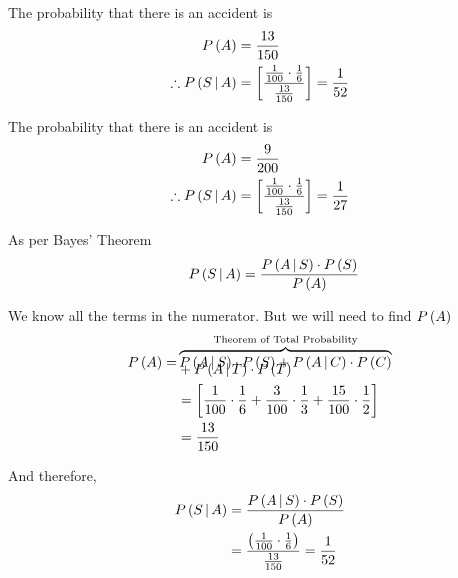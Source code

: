 \documentclass[14pt,fleqn]{extarticle}
\begin{document}
\begin{question}
\begin{step}
\end{step}

\begin{step}
  \begin{options} 
     \correct 
     
       The probability that there is an accident is 
       \begin{align}
       P\left( A\right) &= \frac{13}{150} \\
       \therefore P\left(S\,\vert\,A\right) &= \left[ \dfrac{\frac{1}{100}\cdot\frac{1}{6}}{\frac{13}{150}}\right] =\frac{1}{52} 
\end{align}
     \incorrect
     
     The probability that there is an accident is 
       \begin{align}
       P\left( A\right) &= \frac{9}{200} \\
       \therefore P\left(S\,\vert\,A\right) &= \left[ \dfrac{\frac{1}{100}\cdot\frac{1}{6}}{\frac{13}{150}}\right] =\frac{1}{27} 
\end{align}
        
    \end{options} 
     \reason 
       
     As per Bayes' Theorem 
     \[ \qquad P\left(S\,\vert\,A\right) = \frac{P\left(A\,\vert\,S\right)\cdot P\left(S\right)}{P\left(A\right)}  \]
     
     We know all the terms in the numerator. But we will need to find $P\left( A\right)$
     \begin{align}
	P\left( A\right) = &\overbrace{P\left(A\,\vert\,S\right)\cdot P\left( S\right) + P\left(A\,\vert\,C\right)\cdot P\left( C\right)}^{\text{Theorem of Total Probability}} \\[-10pt]
	&+ P\left(A\,\vert\,T\right)\cdot P\left( T\right) \\
	&= \left[ \frac{1}{100}\cdot\frac{1}{6} + \frac{3}{100}\cdot\frac{1}{3} + \frac{15}{100}\cdot\frac{1}{2} \right] \\
	&= \frac{13}{150} 
\end{align}

And therefore, 
\begin{align}
P\left(S\,\vert\,A\right) &= \frac{P\left(A\,\vert\,S\right)\cdot P\left(S\right)}{P\left(A\right)} \\
&= \dfrac{ \left( \frac{1}{100}\cdot\frac{1}{6}\right)}{\frac{13}{150}} = \frac{1}{52}
\end{align}

\end{step}
          
\end{question} 
\end{document}

